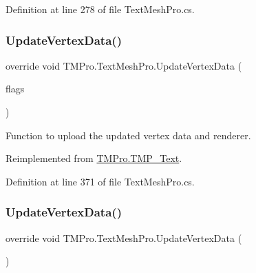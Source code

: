 Definition at line 278 of file Text\+Mesh\+Pro.\+cs.

\mbox{\label{class_t_m_pro_1_1_text_mesh_pro_a0011d887bd47e96fc4d12ee9d6c486f3}} 
\subsubsection{\texorpdfstring{UpdateVertexData()}{UpdateVertexData()}\hspace{0.1cm}{\footnotesize\ttfamily [1/2]}}
{\footnotesize\ttfamily override void T\+M\+Pro.\+Text\+Mesh\+Pro.\+Update\+Vertex\+Data (\begin{DoxyParamCaption}\item[{\mbox{\hyperlink{namespace_t_m_pro_a517464fab2ef7ff5b9658d2acaf49a57}{T\+M\+P\+\_\+\+Vertex\+Data\+Update\+Flags}}}]{flags }\end{DoxyParamCaption})\hspace{0.3cm}{\ttfamily [virtual]}}



Function to upload the updated vertex data and renderer. 



Reimplemented from \mbox{\hyperlink{class_t_m_pro_1_1_t_m_p___text_ae4079b9679758f2a086a0e9f63893475}{T\+M\+Pro.\+T\+M\+P\+\_\+\+Text}}.



Definition at line 371 of file Text\+Mesh\+Pro.\+cs.

\mbox{\label{class_t_m_pro_1_1_text_mesh_pro_a73f2ed2115c65a8a5efcab863eb53383}} 
\subsubsection{\texorpdfstring{UpdateVertexData()}{UpdateVertexData()}\hspace{0.1cm}{\footnotesize\ttfamily [2/2]}}
{\footnotesize\ttfamily override void T\+M\+Pro.\+Text\+Mesh\+Pro.\+Update\+Vertex\+Data (\begin{DoxyParamCaption}{ }\end{DoxyParamCaption})\hspace{0.3cm}{\ttfamily [virtual]}}



